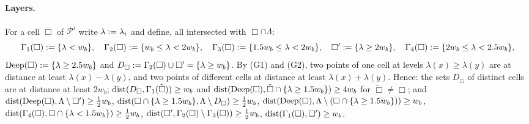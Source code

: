 \paragraph{Layers.} For a cell $\Box$ of $\mathcal P^i$ write $\lambda:=\lambda_i$ and define, all intersected with $\Box\cap\Lambda$:
\[
\Gamma_1(\Box):=\{\lambda<w_b\},\quad\Gamma_2(\Box):=\{w_b\le\lambda<2w_b\},\quad\Gamma_3(\Box):=\{1.5w_b\le\lambda<2w_b\},\quad\Box':=\{\lambda\ge2w_b\},\quad\Gamma_4(\Box):=\{2w_b\le\lambda<2.5w_b\},
\]
$\mathrm{Deep}(\Box):=\{\lambda\ge2.5w_b\}$ and $D_\Box:=\Gamma_2(\Box)\cup\Box'=\{\lambda\ge w_b\}$. By (G1) and (G2), two points of one cell at levels $\lambda(x)\ge\lambda(y)$ are at distance at least $\lambda(x)-\lambda(y)$, and two points of different cells at distance at least $\lambda(x)+\lambda(y)$. Hence: the sets $D_\Box$ of distinct cells are at distance at least $2w_b$; $\operatorname{dist}(D_\Box,\Gamma_1(\tilde\Box))\ge w_b$ and $\operatorname{dist}(\mathrm{Deep}(\Box),\tilde\Box\cap\{\lambda\ge1.5w_b\})\ge4w_b$ for $\tilde\Box\ne\Box$; and $\operatorname{dist}(\mathrm{Deep}(\Box),\Lambda\setminus\Box')\ge\frac12w_b$, $\operatorname{dist}(\Box\cap\{\lambda\ge1.5w_b\},\Lambda\setminus D_\Box)\ge\frac12w_b$, $\operatorname{dist}(\mathrm{Deep}(\Box),\Lambda\setminus(\Box\cap\{\lambda\ge1.5w_b\}))\ge w_b$, $\operatorname{dist}(\Gamma_4(\Box),\Box\cap\{\lambda<1.5w_b\})\ge\frac12w_b$, $\operatorname{dist}(\Box',\Gamma_2(\Box)\setminus\Gamma_3(\Box))\ge\frac12w_b$, $\operatorname{dist}(\Gamma_1(\Box),\Box')\ge w_b$.

